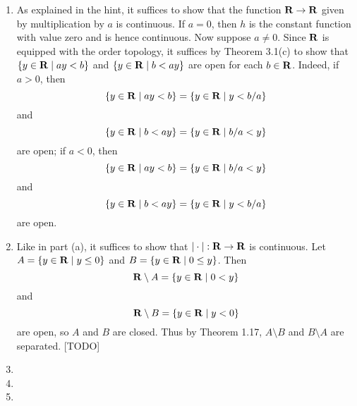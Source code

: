 \begin{prob}
\begin{enumerate}
\item As explained in the hint, it suffices to show that the function $\mathbf{R} \to \mathbf{R}$ given by multiplication by $a$ is continuous. If $a = 0$, then $h$ is the constant function with value zero and is hence continuous. Now suppose $a \not = 0$. Since $\mathbf{R}$ is equipped with the order topology, it suffices by Theorem 3.1(c) to show that $\{y \in \mathbf{R}\mid ay < b\}$ and $\{y \in \mathbf{R}\mid b < ay\}$ are open for each $b \in \mathbf{R}$. Indeed, if $a > 0$, then \[\{y \in \mathbf{R}\mid ay < b\} = \{y \in \mathbf{R}\mid y < b/a\}\] and \[\{y \in \mathbf{R}\mid b < ay\} = \{y \in \mathbf{R}\mid b/a < y\}\] are open; if $a < 0$, then \[\{y \in \mathbf{R}\mid ay < b\} = \{y \in \mathbf{R}\mid b/a < y\}\] and \[\{y \in \mathbf{R}\mid b < ay\} = \{y \in \mathbf{R}\mid y < b/a\}\] are open.

\item Like in part (a), it suffices to show that $|\cdot|: \mathbf{R} \to \mathbf{R}$ is continuous. Let $A = \{y \in \mathbf{R}\mid y \leq 0\}$ and $B = \{y \in \mathbf{R}\mid 0 \leq y\}$. Then \[\mathbf{R}\setminus A = \{y \in \mathbf{R}\mid 0 < y\}\] and \[\mathbf{R}\setminus B = \{y \in \mathbf{R}\mid y < 0\}\] are open, so $A$ and $B$ are closed. Thus by Theorem 1.17, $A\setminus B$ and $B\setminus A$ are separated. [TODO]

\item 

\item 

\item 
\end{enumerate}
\end{prob}

